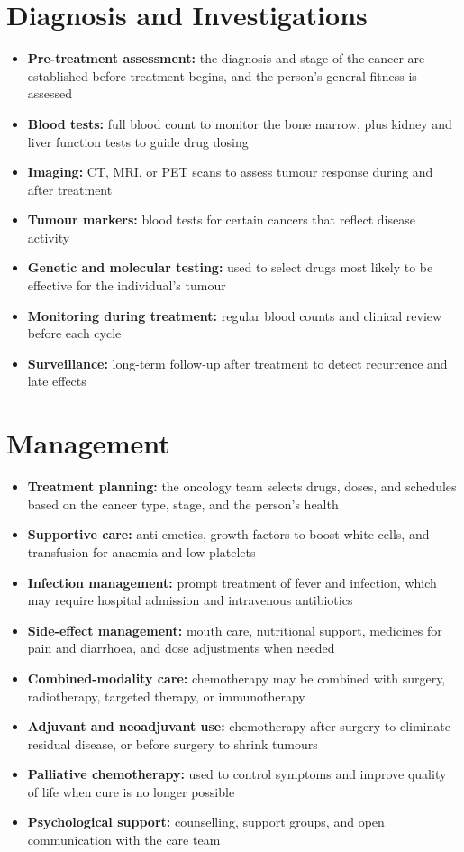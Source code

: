 \section*{Diagnosis and Investigations}
\begin{itemize}
    \item \textbf{Pre-treatment assessment:} the diagnosis and stage of the cancer are established before treatment begins, and the person's general fitness is assessed
    \item \textbf{Blood tests:} full blood count to monitor the bone marrow, plus kidney and liver function tests to guide drug dosing
    \item \textbf{Imaging:} CT, MRI, or PET scans to assess tumour response during and after treatment
    \item \textbf{Tumour markers:} blood tests for certain cancers that reflect disease activity
    \item \textbf{Genetic and molecular testing:} used to select drugs most likely to be effective for the individual's tumour
    \item \textbf{Monitoring during treatment:} regular blood counts and clinical review before each cycle
    \item \textbf{Surveillance:} long-term follow-up after treatment to detect recurrence and late effects
\end{itemize}

\section*{Management}
\begin{itemize}
    \item \textbf{Treatment planning:} the oncology team selects drugs, doses, and schedules based on the cancer type, stage, and the person's health
    \item \textbf{Supportive care:} anti-emetics, growth factors to boost white cells, and transfusion for anaemia and low platelets
    \item \textbf{Infection management:} prompt treatment of fever and infection, which may require hospital admission and intravenous antibiotics
    \item \textbf{Side-effect management:} mouth care, nutritional support, medicines for pain and diarrhoea, and dose adjustments when needed
    \item \textbf{Combined-modality care:} chemotherapy may be combined with surgery, radiotherapy, targeted therapy, or immunotherapy
    \item \textbf{Adjuvant and neoadjuvant use:} chemotherapy after surgery to eliminate residual disease, or before surgery to shrink tumours
    \item \textbf{Palliative chemotherapy:} used to control symptoms and improve quality of life when cure is no longer possible
    \item \textbf{Psychological support:} counselling, support groups, and open communication with the care team
\end{itemize}

